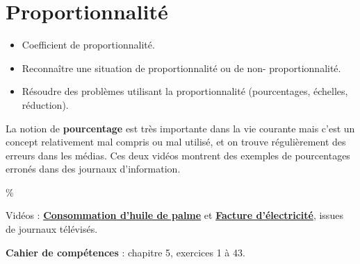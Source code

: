 \themaO
\graphicspath{{../../S16_Proportionnalite/Images/}}

\chapter{Proportionnalité}
\label{S16}


\begin{prerequis}
   \begin{itemize}
     \item Coefficient de proportionnalité.
     \item[\com] Reconnaître une situation de proportionnalité ou de non- proportionnalité.
     \item[\com] Résoudre des problèmes utilisant la proportionnalité (pourcentages, échelles, réduction).
   \end{itemize}
\end{prerequis}

\vfill

\begin{debat} 
   La notion de {\bf pourcentage} est très importante dans la vie courante mais c'est un concept relativement mal compris ou mal utilisé, et on trouve régulièrement des erreurs dans les médias. Ces deux vidéos montrent des exemples de pourcentages erronés dans des journaux d'information. \\
   \begin{center}
      \textcolor{B1}{\fontsize{70}{80}\selectfont \%}
   \end{center}
   \bigskip
   \begin{cadre}[B2][F4]
      \begin{center}
         Vidéos : \href{https://www.youtube.com/watch?v=ibWzdm_05zs}{\bf Consommation d'huile de palme} et \href{https://www.youtube.com/watch?v=gLbsxj8mv-U}{\bf Facture d'électricité}, issues de journaux télévisés.
      \end{center}
   \end{cadre}
\end{debat}

\vfill

\textcolor{PartieGeometrie}{\sffamily\bfseries Cahier de compétences} : chapitre 5, exercices 1 à 43.


\activites

